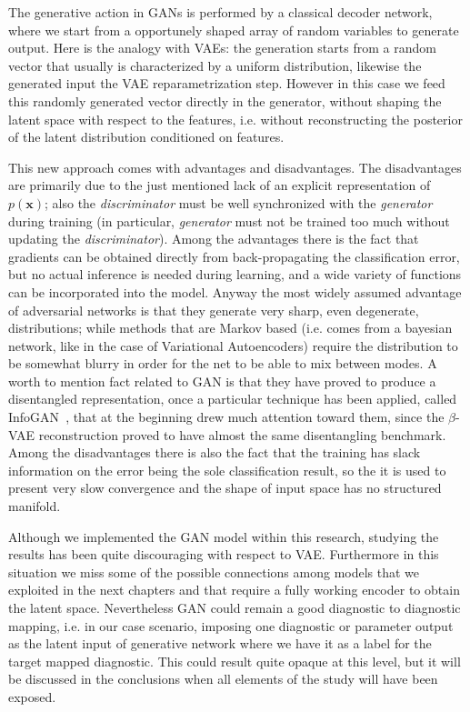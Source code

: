 The generative action in GANs is performed by a classical decoder network, where we start from a opportunely shaped array of random variables to generate output. Here is the analogy with VAEs: the generation starts from a random vector that usually is characterized by a uniform distribution, likewise the generated input the VAE reparametrization step. However in this case we feed this randomly generated vector directly in the generator, without shaping the latent space with respect to the features, i.e. without reconstructing the posterior of the latent distribution conditioned on features.

This new approach comes with advantages and disadvantages. 
%
The disadvantages are primarily due to the just mentioned lack of an explicit representation of $p(\bm{x})$; also the \textit{discriminator} must be well synchronized with the \textit{generator} during training (in particular, \textit{generator} must not be trained too much without updating the \textit{discriminator}).
%
Among the advantages there is the fact that gradients can be obtained directly from back-propagating the classification error, but no actual inference is needed during learning, and a wide variety of functions can be incorporated into the model.
Anyway the most widely assumed advantage of adversarial networks is that they generate very sharp, even degenerate, distributions; while methods that are Markov based (i.e. comes from a bayesian network, like in the case of Variational Autoencoders) require the distribution to be somewhat blurry in order for the net to be able to mix between modes.
A worth to mention fact related to GAN is that they have proved to produce a disentangled representation, once a particular technique has been applied, called InfoGAN~\cite{NIPS2016_6399}, that at the beginning drew much attention toward them, since the $\beta$-VAE reconstruction proved to have almost the same disentangling benchmark.
%
Among the disadvantages there is also the fact that the training has slack information on the error being the sole classification result, so the it is used to present very slow convergence and the shape of input space has no structured manifold.

Although we implemented the GAN model within this research, studying the results has been quite discouraging with respect to VAE. Furthermore in this situation we miss some of the possible connections among models that we exploited in the next chapters and that require a fully working encoder to obtain the latent space.
Nevertheless GAN could remain a good diagnostic to diagnostic mapping, i.e. in our case scenario, imposing one diagnostic or parameter output as the latent input of generative network where we have it as a label for the target mapped diagnostic.
This could result quite opaque at this level, but it will be discussed in the conclusions when all elements of the study will have been exposed.


